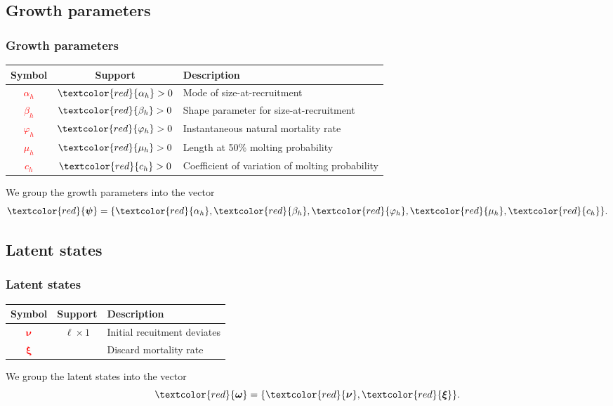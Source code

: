 \documentclass{beamer}
\begin{document}
\subsection{Growth parameters}
\begin{frame}
\frametitle{Growth parameters}
\begin{table}
  \centering
  \begin{tabular}{ccl}
  \hline
  Symbol & Support & Description \\
  \hline
      \textcolor{red}{$\alpha_h$} & $\textcolor{red}{\alpha_h} > 0$ & Mode of size-at-recruitment\\
      \textcolor{red}{$\beta_h$} & $\textcolor{red}{\beta_h} > 0$ & Shape parameter for size-at-recruitment\\
      \textcolor{red}{$\varphi_h$} & $\textcolor{red}{\varphi_h} > 0$ & Instantaneous natural mortality rate\\
      \textcolor{red}{$\mu_h$} & $\textcolor{red}{\mu_h} > 0$ & Length at 50\% molting probability\\
      \textcolor{red}{$c_h$} & $\textcolor{red}{c_h} > 0$ & Coefficient of variation of molting probability\\
  \hline
  \end{tabular}
\end{table}
We group the growth parameters into the vector
\begin{equation*}
  \textcolor{red}{\boldsymbol\psi} = \{ \textcolor{red}{\alpha_h}, 
  \textcolor{red}{\beta_h}, \textcolor{red}{\varphi_h}, \textcolor{red}{\mu_h},
  \textcolor{red}{c_h} \}.
\end{equation*}
\end{frame}


\subsection{Latent states}
\begin{frame}
\frametitle{Latent states}
\begin{table}
  \centering
  \begin{tabular}{ccl}
  \hline
  Symbol & Support & Description \\
  \hline
      \textcolor{red}{$\boldsymbol\nu$} & $\ell \times 1$ & Initial recuitment deviates \\
      \textcolor{red}{$\boldsymbol\xi$} & &  Discard mortality rate\\
  \hline
  \end{tabular}
\end{table}
We group the latent states into the vector
\begin{equation*}
  \textcolor{red}{\boldsymbol\omega} = \{ \textcolor{red}{\boldsymbol\nu},
  \textcolor{red}{\boldsymbol\xi} \}.
\end{equation*}
\end{frame}
\end{document}
